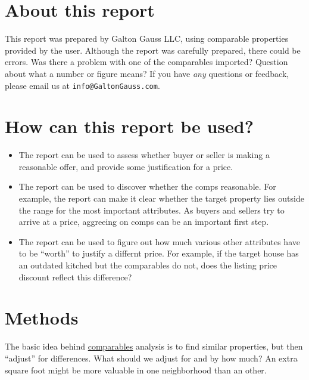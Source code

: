 \documentclass[
10pt, %
a4paper, %
oneside, %
headinclude,footinclude, %
BCOR5mm, %
]{scrartcl}
\begin{document}

\section{About this report}
This report was prepared by Galton Gauss LLC, using comparable properties provided by the user.
Although the report was carefully prepared, there could be errors.
Was there a problem with one of the comparables imported?
Question about what a number or figure means?
If you have \emph{any} questions or feedback, please email us at \texttt{info@GaltonGauss.com}.


\section{How can this report be used?}
\begin{itemize}
\item The report can be used to assess whether buyer or seller is making a reasonable offer, and provide some justification for a price. 
\item The report can be used to discover whether the comps reasonable. For example, the report can make it clear whether the target property lies outside the range for the most important attributes. As buyers and sellers try to arrive at a price, aggreeing on comps can be an important first step. 
\item The report can be used to figure out how much various other attributes have to be ``worth'' to justify a differnt price. For example, if the target house has an outdated kitched but the comparables do not, does the listing price discount reflect this difference? 
\end{itemize} 

\section{Methods}
The basic idea behind \href{https://en.wikipedia.org/wiki/Comparables}{comparables} analysis is to find similar properties, but then ``adjust'' for differences.
What should we adjust for and by how much? 
An extra square foot might be more valuable in one neighborhood than an other. 
\end{document}
